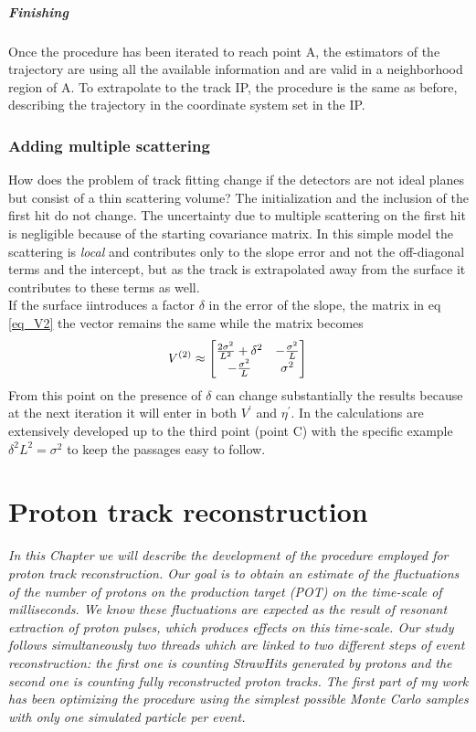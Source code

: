 \documentclass[12pt,a4paper,openright, oneside, titlepage]{book} %
\begin{document}
\paragraph{Finishing} Once the procedure has been iterated  to reach point A, 
the estimators of the trajectory are using all the available information and are valid in a neighborhood region of A. 
To extrapolate to the track IP, 
the procedure is the same as before, 
describing the trajectory in the coordinate system set in the IP. 

\subsection*{Adding multiple scattering}
How does the problem of track fitting change if the detectors are not ideal planes but consist of a thin scattering volume? 
The initialization and the inclusion of the first hit do not change. 
The uncertainty due to multiple scattering on the first hit is negligible because of the starting covariance matrix. 
In this simple model the scattering is \textit{local} and contributes only to the slope error and not the off-diagonal terms 
and the intercept, but as the track is extrapolated away from the surface it contributes to these terms as well.\\
If the surface iintroduces a factor $\delta$ in the error of the slope, 
the matrix in eq \ref{eq_V2} the vector remains the same while the matrix becomes
$$
V^{(2)}\approx
\begin{bmatrix}
\frac{2\sigma^2}{L^2}+\delta^2 & -\frac{\sigma^2}{L} \\
-\frac{\sigma^2}{L} & \sigma^2
\end{bmatrix}\\
$$
From this point on the presence of $\delta$ can change substantially the results because at the next iteration it will enter in both $V^\prime$ and $\eta^\prime$.
 In \cite{KutschkePaper} the calculations are extensively developed up to the third point (point C) 
 with the specific example $\delta^2L^2=\sigma^2$ to keep the passages easy to follow.

\chapter{Proton track reconstruction}
{\itshape In this Chapter we will describe the development of the procedure 
employed for proton track reconstruction.  
Our goal is to obtain an estimate of the fluctuations of the number of protons 
on the production target (POT) on the time-scale of milliseconds. 
We know these fluctuations are expected as the result of resonant extraction of proton pulses, 
which produces effects on this time-scale. 
Our study follows simultaneously two threads which are linked to two different steps of event reconstruction: 
the first one is counting StrawHits generated by protons and the second one is counting fully reconstructed proton tracks. 
The first part of my work has been optimizing the procedure 
using the simplest possible Monte Carlo samples with only one simulated particle per event.}
\end{document}
